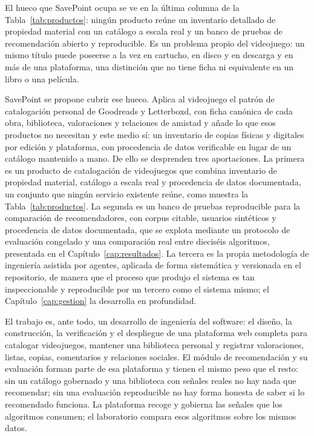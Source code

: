 El hueco que SavePoint ocupa se ve en la última columna de la
Tabla~\ref{tab:productos}: ningún producto reúne un inventario detallado de propiedad
material con un catálogo a escala real y un banco de pruebas de recomendación abierto y
reproducible. Es un problema propio del videojuego: un mismo título puede poseerse a la vez en
cartucho, en disco y en descarga y en más de una plataforma, una distinción que no tiene ficha
ni equivalente en un libro o una película.

SavePoint se propone cubrir ese hueco. Aplica al videojuego el patrón de catalogación personal
de Goodreads y Letterboxd, con ficha canónica de cada obra, biblioteca, valoraciones y relaciones
de amistad y añade lo que esos productos no necesitan y este medio sí: un inventario de copias
físicas y digitales por edición y plataforma, con procedencia de datos verificable en lugar de
un catálogo mantenido a mano. De ello se desprenden tres aportaciones. La primera es un
producto de catalogación de videojuegos que combina inventario de propiedad material, catálogo
a escala real y procedencia de datos documentada, un conjunto que ningún servicio existente
reúne, como muestra la Tabla~\ref{tab:productos}. La segunda es un banco de pruebas reproducible
para la comparación de recomendadores, con corpus citable, usuarios sintéticos y procedencia de
datos documentada, que se explota mediante un protocolo de evaluación congelado y una
comparación real entre dieciséis algoritmos, presentada en el Capítulo~\ref{cap:resultados}. La
tercera es la propia metodología de ingeniería asistida por agentes, aplicada de forma
sistemática y versionada en el repositorio, de manera que el proceso que produjo el sistema es
tan inspeccionable y reproducible por un tercero como el sistema mismo; el
Capítulo~\ref{cap:gestion} la desarrolla en profundidad.

El trabajo es, ante todo, un desarrollo de ingeniería del software: el diseño, la construcción,
la verificación y el despliegue de una plataforma web completa para catalogar videojuegos,
mantener una biblioteca personal y registrar valoraciones, listas, copias, comentarios y
relaciones sociales. El módulo de recomendación y su evaluación forman parte de esa
plataforma y tienen el mismo peso que el resto: sin un catálogo gobernado y una biblioteca con
señales reales no hay nada que recomendar; sin una evaluación reproducible no hay forma
honesta de saber si lo recomendado funciona. La plataforma recoge y gobierna las señales que
los algoritmos consumen; el laboratorio compara esos algoritmos sobre los mismos datos.

